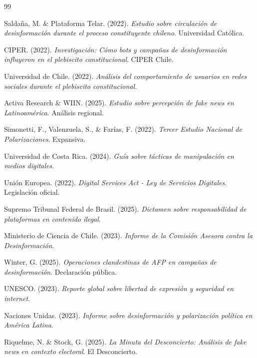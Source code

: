 \begin{thebibliography}{99}

 Saldaña, M. \& Plataforma Telar. (2022). \textit{Estudio sobre circulación de desinformación durante el proceso constituyente chileno}. Universidad Católica.

 CIPER. (2022). \textit{Investigación: Cómo bots y campañas de desinformación influyeron en el plebiscito constitucional}. CIPER Chile.

 Universidad de Chile. (2022). \textit{Análisis del comportamiento de usuarios en redes sociales durante el plebiscito constitucional}.

 Activa Research \& WIIN. (2025). \textit{Estudio sobre percepción de fake news en Latinoamérica}. Análisis regional.

 Simonetti, F., Valenzuela, S., \& Farías, F. (2022). \textit{Tercer Estudio Nacional de Polarizaciones}. Expansiva.

 Universidad de Costa Rica. (2024). \textit{Guía sobre tácticas de manipulación en medios digitales}.

 Unión Europea. (2022). \textit{Digital Services Act - Ley de Servicios Digitales}. Legislación oficial.

 Supremo Tribunal Federal de Brasil. (2025). \textit{Dictamen sobre responsabilidad de plataformas en contenido ilegal}.

 Ministerio de Ciencia de Chile. (2023). \textit{Informe de la Comisión Asesora contra la Desinformación}.

 Winter, G. (2025). \textit{Operaciones clandestinas de AFP en campañas de desinformación}. Declaración pública.

 UNESCO. (2023). \textit{Reporte global sobre libertad de expresión y seguridad en internet}.

 Naciones Unidas. (2023). \textit{Informe sobre desinformación y polarización política en América Latina}.

 Riquelme, N. \& Stock, G. (2025). \textit{La Minuta del Desconcierto: Análisis de fake news en contexto electoral}. El Desconcierto.

\end{thebibliography}


